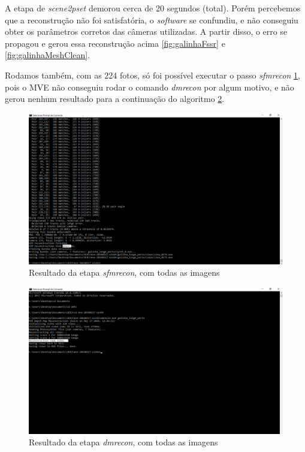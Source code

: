 A etapa de \emph{scene2pset} demorou cerca de 20 segundos (total). Porém percebemos que a reconstrução não foi satisfatória, o \emph{software} se confundiu, e não conseguiu obter os parâmetros corretos das câmeras utilizadas. A partir disso, o erro se propagou e gerou essa reconstrução acima \ref{fig:galinhaFssr} e \ref{fig:galinhaMeshClean}.

Rodamos também, com as 224 fotos, só foi possível executar o passo \emph{sfmrecon} \ref{fig:galinhaSfM224}, pois o MVE não conseguiu rodar o comando \emph{dmrecon} por algum motivo, e não gerou nenhum resultado para a continuação do algoritmo \ref{fig:galinhaDMR224}.

\begin{figure}[!h]
	\centering
	\includegraphics[width=0.5\linewidth]{figs/mvesfmrecongalinhapertolonge.png}
	\caption{%
	Resultado da etapa \emph{sfmrecon}, com todas as imagens
	}\label{fig:galinhaSfM224}
\end{figure}

\begin{figure}[!h]
	\centering
	\includegraphics[width=0.5\linewidth]{figs/mvedmrecongalinhapertolonge.png}
	\caption{%
	Resultado da etapa \emph{dmrecon}, com todas as imagens
	}\label{fig:galinhaDMR224}
\end{figure}
